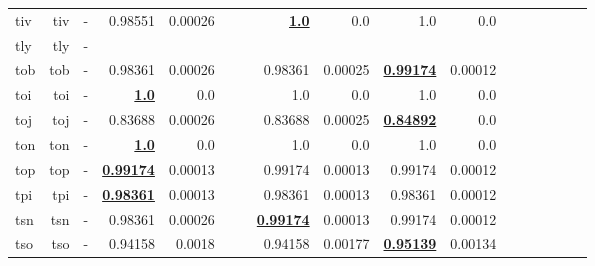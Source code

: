 \documentclass[11pt]{article}
\begin{document}
\begin{table*}[h]
{\begin{tabular}{lrrrrrrrrrrrrrrrr}
tiv         & tiv         & -         & 0.98551         & 0.00026         &          &          & \textbf{\underline{1.0}}         & 0.0         & 1.0         & 0.0         &          &          &          &          \\
tly         & tly         & -         &          &          &          &          &          &          &          &          &          &          &          &          \\
tob         & tob         & -         & 0.98361         & 0.00026         &          &          & 0.98361         & 0.00025         & \textbf{\underline{0.99174}}         & 0.00012         &          &          &          &          \\
toi         & toi         & -         & \textbf{\underline{1.0}}         & 0.0         &          &          & 1.0         & 0.0         & 1.0         & 0.0         &          &          &          &          \\
toj         & toj         & -         & 0.83688         & 0.00026         &          &          & 0.83688         & 0.00025         & \textbf{\underline{0.84892}}         & 0.0         &          &          &          &          \\
ton         & ton         & -         & \textbf{\underline{1.0}}         & 0.0         &          &          & 1.0         & 0.0         & 1.0         & 0.0         &          &          &          &          \\
top         & top         & -         & \textbf{\underline{0.99174}}         & 0.00013         &          &          & 0.99174         & 0.00013         & 0.99174         & 0.00012         &          &          &          &          \\
tpi         & tpi         & -         & \textbf{\underline{0.98361}}         & 0.00013         &          &          & 0.98361         & 0.00013         & 0.98361         & 0.00012         &          &          &          &          \\
tsn         & tsn         & -         & 0.98361         & 0.00026         &          &          & \textbf{\underline{0.99174}}         & 0.00013         & 0.99174         & 0.00012         &          &          &          &          \\
tso         & tso         & -         & 0.94158         & 0.0018         &          &          & 0.94158         & 0.00177         & \textbf{\underline{0.95139}}         & 0.00134         &          &          &          &          \\

\end{tabular}}
\end{table*}
\end{document}

